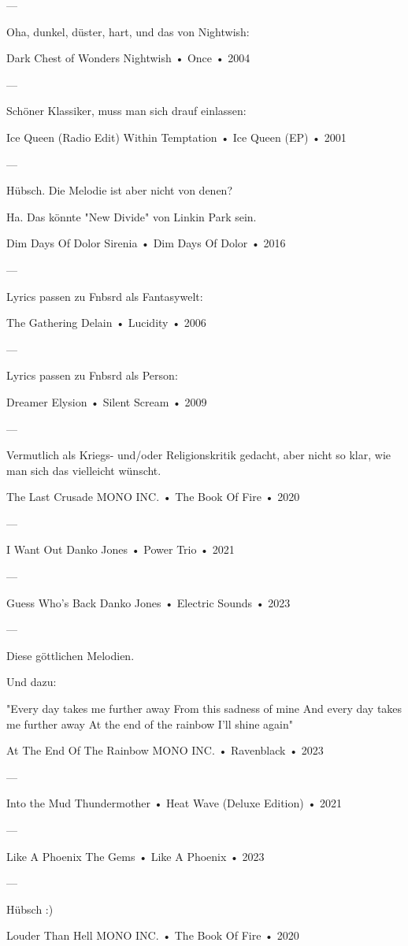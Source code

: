 —

Oha, dunkel, düster, hart, und das von Nightwish:

Dark Chest of Wonders
Nightwish
 •
Once
 •
2004

—

Schöner Klassiker, muss man sich drauf einlassen:


Ice Queen (Radio Edit)
Within Temptation
 •
Ice Queen (EP)
 •
2001

—

Hübsch. Die Melodie ist aber nicht von denen?

Ha. Das könnte "New Divide" von Linkin Park sein.

Dim Days Of Dolor
Sirenia
 •
Dim Days Of Dolor
 •
2016

—

Lyrics passen zu Fnbsrd als Fantasywelt:

The Gathering
Delain
 •
Lucidity
 •
2006

—

Lyrics passen zu Fnbsrd als Person:

Dreamer
Elysion
 •
Silent Scream
 •
2009

—

Vermutlich als Kriegs- und/oder Religionskritik gedacht, aber nicht so klar, wie man sich das vielleicht wünscht.

The Last Crusade
MONO INC.
 •
The Book Of Fire
 •
2020

—

I Want Out
Danko Jones
 •
Power Trio
 • 2021

—

Guess Who's Back
Danko Jones
 •
Electric Sounds
 • 2023

—

Diese göttlichen Melodien.

Und dazu:

"Every day takes me further away
From this sadness of mine
And every day takes me further away
At the end of the rainbow I'll shine again"

At The End Of The Rainbow
MONO INC.
 •
Ravenblack
 • 2023

—

Into the Mud
Thundermother
 •
Heat Wave (Deluxe Edition)
 • 2021

—

Like A Phoenix
The Gems
 •
Like A Phoenix
 • 2023

—

Hübsch :)

Louder Than Hell
MONO INC.
 •
The Book Of Fire
 •
2020


